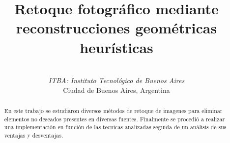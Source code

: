 \documentclass[conference]{IEEEtran}
\begin{document}
\title{Retoque fotográfico mediante reconstrucciones geométricas heurísticas}
\author{
 \\
\textit{ITBA: Instituto Tecnológico de Buenos Aires}\\
Ciudad de Buenos Aires, Argentina
}
\maketitle

\begin{abstract}
En este trabajo se estudiaron
 diversos métodos de retoque de imagenes para eliminar elementos no deseados presentes en diversas fuentes. Finalmente se procedió a realizar una implementación en función de las tecnicas analizadas seguida de un análisis de sus ventajas y desventajas.
\end{abstract}
\end{document}

